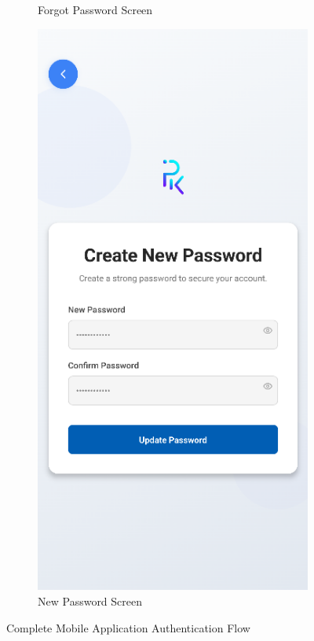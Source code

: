 \begin{figure}[htbp]
\begin{subfigure}[b]{0.24\textwidth}
        \caption{Forgot Password Screen}
        \label{fig:mobile-forgot-password}
    \end{subfigure}
    \hfill
    \begin{subfigure}[b]{0.24\textwidth}
        \centering
        \includegraphics[width=\textwidth]{images/mobile-auth-screen_newpassword.png}
        \caption{New Password Screen}
        \label{fig:mobile-new-password}
    \end{subfigure}
    \caption{Complete Mobile Application Authentication Flow}
    \label{fig:mobile-auth-interfaces}
\end{figure}

